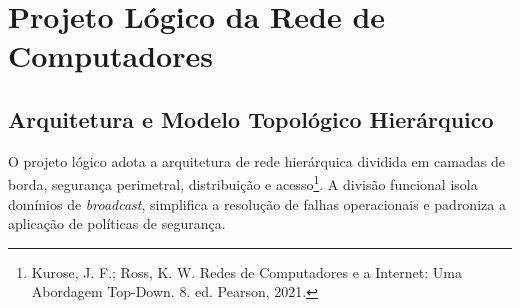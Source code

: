 
\chapter{Projeto Lógico da Rede de Computadores}
\label{cap:projeto_logico}

\section{Arquitetura e Modelo Topológico Hierárquico}

O projeto lógico adota a arquitetura de rede hierárquica dividida em camadas de borda, segurança perimetral, distribuição e acesso\footnote{Kurose, J. F.; Ross, K. W. Redes de Computadores e a Internet: Uma Abordagem Top-Down. 8. ed. Pearson, 2021.}. A divisão funcional isola domínios de \textit{broadcast}, simplifica a resolução de falhas operacionais e padroniza a aplicação de políticas de segurança.

